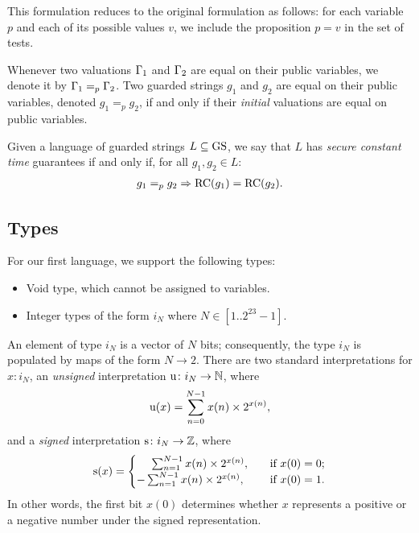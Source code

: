 \begin{remark}
{This formulation reduces to the original formulation as follows: for each variable $p$ and each of its possible values $v$, we include the proposition $p=v$ in the set of tests.}
\end{remark}
\begin{definition}
Whenever two valuations $\Gamma_1$ and $\Gamma_2$ are equal on their public variables, we denote it by $\Gamma_1=_p\Gamma_2$. Two guarded strings $g_1$ and $g_2$ are equal on their public variables, denoted $g_1=_p g_2$, if and only if their \emph{initial} valuations are equal on public variables. 
\end{definition}
\begin{definition}
Given a language of guarded strings $L\subseteq \text{GS}$, we say that $L$ has \emph{secure constant time} guarantees if and only if, for all $g_1, g_2 \in L:$
\begin{align}
g_1=_p g_2\Rightarrow\text{RC}(g_1)=\text{RC}(g_2).
\end{align}
\end{definition}

\subsection{Types}
For our first language, we support the following types:
\begin{itemize}
\item Void type, which cannot be assigned to variables.
\item Integer types of the form $i_N$ where $N\in [1..2^{23}-1]$.
\end{itemize}
An element of type $i_N$ is a vector of $N$ bits; consequently, the type $i_N$ is populated by maps of the form $N\rightarrow 2$. There are two standard interpretations for $x\colon i_N$, an \emph{unsigned} interpretation $\text{u}\colon i_N\rightarrow \mathbb{N}$, where 
\begin{align}
\text{u}(x)= \sum_{n=0}^{N-1} x(n)\times2^{x(n)},
\end{align}
and a \emph{signed} interpretation $\text{s}\colon i_N\rightarrow \mathbb{Z}$, where
\begin{align}
\text{s}(x)= 
\begin{cases}
\ \ \ \ \sum_{n=1}^{N-1} x(n)\times2^{x(n)},\quad &\text{if $x(0)=0$};\\
-\sum_{n=1}^{N-1} x(n)\times2^{x(n)},\quad &\text{if $x(0)=1$}.
\end{cases}
\end{align}
In other words, the first bit $x(0)$ determines whether $x$ represents a positive or a negative number under the signed representation.

